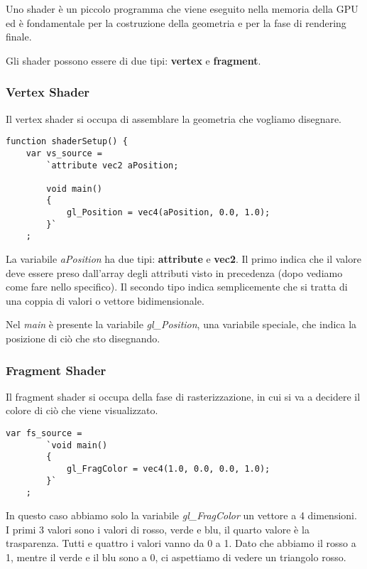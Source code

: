 Uno shader \`e un piccolo programma che viene eseguito nella memoria della GPU ed \`e
fondamentale per la costruzione della geometria e per la fase di rendering finale.

Gli shader possono essere di due tipi: \textbf{vertex} e \textbf{fragment}.

\subsubsection{Vertex Shader}
Il vertex shader si occupa di assemblare la geometria che vogliamo disegnare.
\begin{lstlisting}[style=javascript-style]
function shaderSetup() {
	var vs_source =
		`attribute vec2 aPosition;
		
		void main()
		{
			gl_Position = vec4(aPosition, 0.0, 1.0);
		}`
	;
\end{lstlisting}
La variabile \emph{aPosition} ha due tipi: \textbf{attribute} e \textbf{vec2}. Il primo
indica che il valore deve essere preso dall'array degli attributi visto in precedenza
(dopo vediamo come fare nello specifico). Il secondo tipo indica semplicemente che
si tratta di una coppia di valori o vettore bidimensionale.

Nel \emph{main} \`e presente la variabile \emph{gl\_Position}, una variabile speciale, che
indica la posizione di ci\`o che sto disegnando.

\subsubsection{Fragment Shader}
Il fragment shader si occupa della fase di rasterizzazione, in cui si va a decidere il
colore di ci\`o che viene visualizzato.
\begin{lstlisting}[style=javascript-style, firstnumber=8]
	var fs_source =
		`void main()
		{
			gl_FragColor = vec4(1.0, 0.0, 0.0, 1.0);
		}`
	;
\end{lstlisting}
In questo caso abbiamo solo la variabile \emph{gl\_FragColor} un vettore a 4 dimensioni.
I primi 3 valori sono i valori di rosso, verde e blu, il quarto valore \`e la trasparenza.
Tutti e quattro i valori vanno da 0 a 1. Dato che abbiamo il rosso a 1, mentre il verde e
il blu sono a 0, ci aspettiamo di vedere un triangolo rosso.

